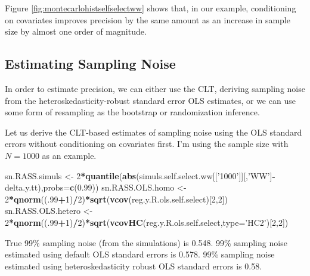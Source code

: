 \documentclass[]{book}
\newenvironment{Shaded}{\begin{snugshade}}{\end{snugshade}}
\newcommand{\KeywordTok}[1]{\textcolor[rgb]{0.13,0.29,0.53}{\textbf{#1}}}
\newcommand{\DataTypeTok}[1]{\textcolor[rgb]{0.13,0.29,0.53}{#1}}
\newcommand{\DecValTok}[1]{\textcolor[rgb]{0.00,0.00,0.81}{#1}}
\newcommand{\FloatTok}[1]{\textcolor[rgb]{0.00,0.00,0.81}{#1}}
\newcommand{\StringTok}[1]{\textcolor[rgb]{0.31,0.60,0.02}{#1}}
\newcommand{\OperatorTok}[1]{\textcolor[rgb]{0.81,0.36,0.00}{\textbf{#1}}}
\newcommand{\NormalTok}[1]{#1}
\theoremstyle{definition}
\theoremstyle{definition}
\theoremstyle{definition}
\theoremstyle{remark}
\let\BeginKnitrBlock\begin \let\EndKnitrBlock\end
\begin{document}
Figure \ref{fig:montecarlohistselfselectww} shows that, in our example,
conditioning on covariates improves precision by the same amount as an
increase in sample size by almost one order of magnitude.

\subsection{Estimating Sampling
Noise}\label{estimating-sampling-noise-1}

In order to estimate precision, we can either use the CLT, deriving
sampling noise from the heteroskedasticity-robust standard error OLS
estimates, or we can use some form of resampling as the bootstrap or
randomization inference.

\BeginKnitrBlock{example}
\protect\hypertarget{exm:unnamed-chunk-86}{}{\label{exm:unnamed-chunk-86}
}Let us derive the CLT-based estimates of sampling noise using the OLS
standard errors without conditioning on covariates first. I'm using the
sample size with \(N=1000\) as an example.
\EndKnitrBlock{example}

\begin{Shaded}
\begin{Highlighting}[]
\NormalTok{sn.RASS.simuls <-}\StringTok{ }\DecValTok{2}\OperatorTok{*}\KeywordTok{quantile}\NormalTok{(}\KeywordTok{abs}\NormalTok{(simuls.self.select.ww[[}\StringTok{'1000'}\NormalTok{]][,}\StringTok{'WW'}\NormalTok{]}\OperatorTok{-}\NormalTok{delta.y.tt),}\DataTypeTok{probs=}\KeywordTok{c}\NormalTok{(}\FloatTok{0.99}\NormalTok{))}
\NormalTok{sn.RASS.OLS.homo <-}\StringTok{ }\DecValTok{2}\OperatorTok{*}\KeywordTok{qnorm}\NormalTok{((.}\DecValTok{99}\OperatorTok{+}\DecValTok{1}\NormalTok{)}\OperatorTok{/}\DecValTok{2}\NormalTok{)}\OperatorTok{*}\KeywordTok{sqrt}\NormalTok{(}\KeywordTok{vcov}\NormalTok{(reg.y.R.ols.self.select)[}\DecValTok{2}\NormalTok{,}\DecValTok{2}\NormalTok{])}
\NormalTok{sn.RASS.OLS.hetero <-}\StringTok{ }\DecValTok{2}\OperatorTok{*}\KeywordTok{qnorm}\NormalTok{((.}\DecValTok{99}\OperatorTok{+}\DecValTok{1}\NormalTok{)}\OperatorTok{/}\DecValTok{2}\NormalTok{)}\OperatorTok{*}\KeywordTok{sqrt}\NormalTok{(}\KeywordTok{vcovHC}\NormalTok{(reg.y.R.ols.self.select,}\DataTypeTok{type=}\StringTok{'HC2'}\NormalTok{)[}\DecValTok{2}\NormalTok{,}\DecValTok{2}\NormalTok{])}
\end{Highlighting}
\end{Shaded}

True 99\% sampling noise (from the simulations) is 0.548. 99\% sampling
noise estimated using default OLS standard errors is 0.578. 99\%
sampling noise estimated using heteroskedasticity robust OLS standard
errors is 0.58.
\end{document}
